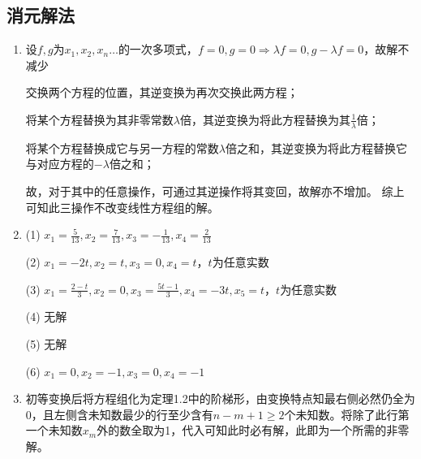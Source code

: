 \documentclass[a4paper,UTF8,fontset=windows]{ctexart}
\begin{document}
\subsection{消元解法}
\begin{enumerate}
\item 	
设$f,g$为$x_1,x_2,x_n\dots$的一次多项式，$f=0,g=0\Rightarrow\lambda f=0,g-\lambda f=0$，故解不减少

交换两个方程的位置，其逆变换为再次交换此两方程；

将某个方程替换为其非零常数$\lambda$倍，其逆变换为将此方程替换为其$\frac{1}{\lambda}$倍；

将某个方程替换成它与另一方程的常数$\lambda$倍之和，其逆变换为将此方程替换它与对应方程的$-\lambda$倍之和；

故，对于其中的任意操作，可通过其逆操作将其变回，故解亦不增加。
综上可知此三操作不改变线性方程组的解。

\item
(1) $x_1=\frac{5}{13}, x_2=\frac{7}{13}, x_3=-\frac{1}{13}, x_4=\frac{2}{13}$

(2) $x_1=-2t,x_2=t,x_3=0,x_4=t$，$t$为任意实数

(3) $x_1=\frac{2-t}{3}, x_2=0, x_3=\frac{5t-1}{3}, x_4=-3t, x_5=t$，$t$为任意实数

(4) 无解

(5) 无解

(6) $x_1=0,x_2=-1,x_3=0,x_4=-1$

\item
初等变换后将方程组化为定理1.2中的阶梯形，由变换特点知最右侧必然仍全为0，且左侧含未知数最少的行至少含有$n-m+1\ge2$个未知数。将除了此行第一个未知数$x_m$外的数全取为1，代入可知此时必有解，此即为一个所需的非零解。
\end{enumerate}
\end{document}
